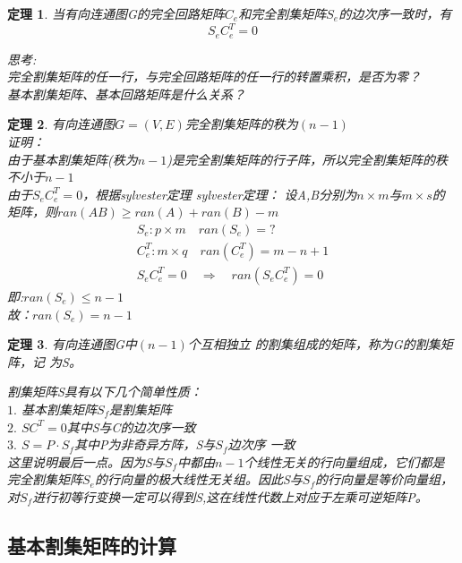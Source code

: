 \documentclass[11pt,a4paper,openany]{book}
\newcommand{\hwxw}{\CJKfamily{hwxw}}
\newcommand{\song}{\CJKfamily{song}}
\newtheorem{theorem}{\textbf{定理}}[section]
\begin{document}
\begin{theorem}
当有向连通图G的完全回路矩阵$C_e$和完全割集矩阵$S_e$的边次序一致时，有$$S_eC_e^T=0$$
\begin{shaded}
{\hwxw 思考:}\\
完全割集矩阵的任一行，与完全回路矩阵的任一行的转置乘积，是否为零？\\
基本割集矩阵、基本回路矩阵是什么关系？\\
\end{shaded}
\end{theorem}

\begin{theorem}
有向连通图$G=(V,E)$完全割集矩阵的秩为$(n-1)$\\
{\song
证明：\\
由于基本割集矩阵(秩为$n-1$)是完全割集矩阵的行子阵，所以完全割集矩阵的秩不小于$n-1$\\
由于$S_eC_e^T=0$，根据sylvester定理
sylvester定理： 设A,B分别为$n\times m$与$m\times s$的
矩阵，则$ran (AB) \geq ran (A)+ran (B)-m$
\begin{gather*}
                                       S_e:p\times m \quad ran(S_e)=? \\
                                       C_e^T:m \times q \quad ran(C_e^T)=m-n+1\\
                                       S_eC_e^T=0 \quad \Rightarrow \quad ran(S_eC_e^T)=0
                                     \end{gather*}
 即:$ran(S_e)\leq n-1$\\
 故：$ran(S_e)=n-1$
}
\end{theorem}

\begin{theorem}
有向连通图G中$(n-1)$个互相独立
的割集组成的矩阵，称为G的割集矩阵，记
为S。
\begin{shaded}
\noindent 割集矩阵S具有以下几个简单性质：\\
$1.$ 基本割集矩阵$S_f$是割集矩阵\\
$2.$ $SC^T=0$其中S与C的边次序一致\\
$3.$ $S=P\cdot S_f$其中P为非奇异方阵，S与$S_f$边次序
一致\\
\indent 这里说明最后一点。因为S与$S_f$中都由$n-1$个线性无关的行向量组成，它们都是
完全割集矩阵$S_e$的行向量的极大线性无关组。因此S与$S_f$的行向量是等价向量组，
对$S_f$进行初等行变换一定可以得到S,这在线性代数上对应于左乘可逆矩阵P。
\end{shaded}
\end{theorem}

\subsection{基本割集矩阵的计算}
\end{document}
